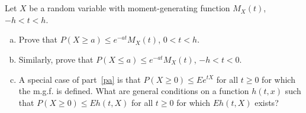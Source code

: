 \documentclass[14pt]{elegantbook}
\begin{document}


\setcounter{chapter}{6}

\chapter{}
    \setcounter{chapter}{3}
    \setcounter{exer}{44}
    \begin{exercise}
        Let $X$ be a random variable with moment-generating function $M_X(t)$, $-h<t<h$. 
        \begin{enumerate}[(a)]
            \item \label{pa}Prove that $P(X\geq a)\leq e^{-at}M_X(t)$, $0<t<h$. 
            \item Similarly, prove that $P(X\leq a)\leq e^{-at}M_X(t)$, $-h<t<0$. 
            \item A special case of part~\ref{pa} is that $P(X\geq 0)\leq Ee^{tX}$ for all $t\geq 0$ for which the m.g.f. is defined. What are general conditions on a function $h(t, x)$ such that $P(X\geq 0)\leq Eh(t, X)$ for all $t\geq 0$ for which $Eh(t, X)$ exists? 
        \end{enumerate}
    \end{exercise}
\end{document}
